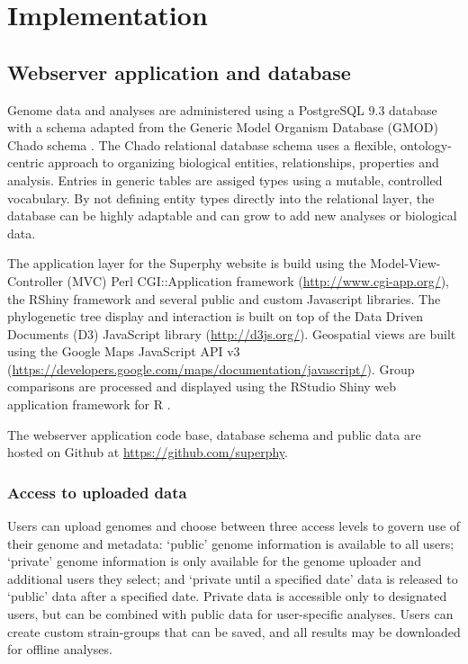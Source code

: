 \documentclass{bmcart}
\begin{document}
\section{Implementation}
\subsection{Webserver application and database}

Genome data and analyses are administered using a PostgreSQL 9.3 database with a schema adapted from the Generic Model Organism Database (GMOD) Chado schema \cite{mungall_chado_2007}. The Chado relational database schema uses a flexible, ontology-centric approach to organizing biological entities, relationships, properties and analysis. Entries in generic tables are assiged types using a mutable, controlled vocabulary. By not defining entity types directly into the relational layer, the database can be highly adaptable and can grow to add new analyses or biological data.

The application layer for the Superphy website is build using the Model-View-Controller (MVC) Perl CGI::Application framework (\url{http://www.cgi-app.org/}), the RShiny framework and several public and custom Javascript libraries. The phylogenetic tree display and interaction is built on top of the Data Driven Documents (D3) JavaScript library (\url{http://d3js.org/}). Geospatial views are built using the Google Maps JavaScript API v3 (\url{https://developers.google.com/maps/documentation/javascript/}). Group comparisons are processed and displayed using the RStudio Shiny web application framework for R \cite{racine_rstudio:_2012}.

The webserver application code base, database schema and public data are hosted on Github at \url{https://github.com/superphy}.

\subsubsection{Access to uploaded data}
Users can upload genomes and choose between three access levels to govern use of their genome and metadata: `public' genome information is available to all users; `private' genome information is only available for the genome uploader and additional users they select; and `private until a specified date' data is released to `public' data after a specified date. Private data is accessible only to designated users, but can be combined with public data for user-specific analyses. Users can create custom strain-groups that can be saved, and all results may be downloaded for offline analyses.
\end{document}
